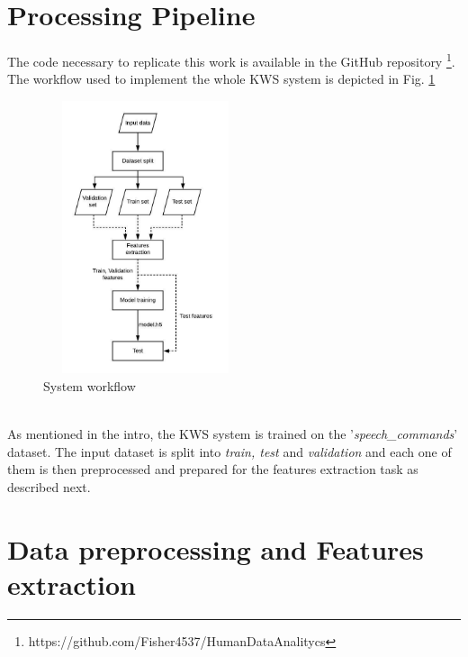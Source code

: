 \section{Processing Pipeline}
\label{sec:processing_pipeine}

\noindent The code necessary to replicate this work is available in the GitHub repository \footnote{https://github.com/Fisher4537/HumanDataAnalitycs}.\\
The workflow used to implement the whole KWS system is depicted in Fig. \ref{fig:pipeline} \\
\begin{figure}[h]
			\centering
	    	\includegraphics[width=6cm, height=8cm ,width=0.25\textwidth]{pipeline}
	    	\caption{System workflow}
	    	\label{fig:pipeline}
\end{figure} \\
\noindent As mentioned in the intro, the KWS system is trained on the '{\it{speech\_commands}}' dataset. The input dataset is split into {\it{train, test}} and {\it{validation}} and each one of them is then preprocessed and prepared for the features extraction task as described next.



\section{Data preprocessing and Features extraction}
\label{sec:model}


